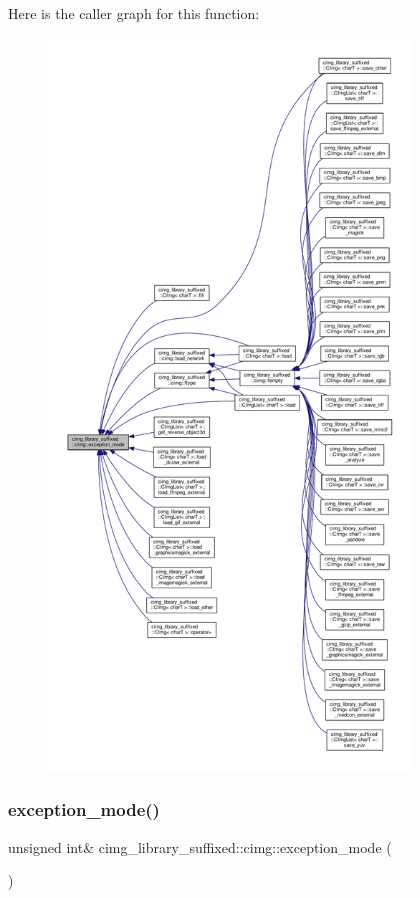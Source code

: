 Here is the caller graph for this function\+:
\nopagebreak
\begin{figure}[H]
\begin{center}
\leavevmode
\includegraphics[height=550pt]{d4/d9b/namespacecimg__library__suffixed_1_1cimg_aeafab144366eddd11360f32f468fa4af_icgraph}
\end{center}
\end{figure}
\mbox{\label{namespacecimg__library__suffixed_1_1cimg_a3ee303866379f1c38eb4807afb3c946a}} 
\subsubsection{\texorpdfstring{exception\+\_\+mode()}{exception\_mode()}\hspace{0.1cm}{\footnotesize\ttfamily [2/2]}}
{\footnotesize\ttfamily unsigned int\& cimg\+\_\+library\+\_\+suffixed\+::cimg\+::exception\+\_\+mode (\begin{DoxyParamCaption}{ }\end{DoxyParamCaption})\hspace{0.3cm}{\ttfamily [inline]}}



